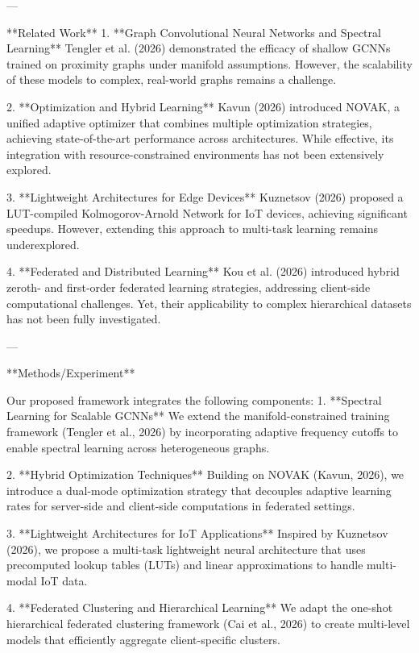 ---

**Related Work**  
1. **Graph Convolutional Neural Networks and Spectral Learning**  
Tengler et al. (2026) demonstrated the efficacy of shallow GCNNs trained on proximity graphs under manifold assumptions. However, the scalability of these models to complex, real-world graphs remains a challenge.

2. **Optimization and Hybrid Learning**  
Kavun (2026) introduced NOVAK, a unified adaptive optimizer that combines multiple optimization strategies, achieving state-of-the-art performance across architectures. While effective, its integration with resource-constrained environments has not been extensively explored.

3. **Lightweight Architectures for Edge Devices**  
Kuznetsov (2026) proposed a LUT-compiled Kolmogorov-Arnold Network for IoT devices, achieving significant speedups. However, extending this approach to multi-task learning remains underexplored.

4. **Federated and Distributed Learning**  
Kou et al. (2026) introduced hybrid zeroth- and first-order federated learning strategies, addressing client-side computational challenges. Yet, their applicability to complex hierarchical datasets has not been fully investigated.

---

**Methods/Experiment**  

Our proposed framework integrates the following components:
1. **Spectral Learning for Scalable GCNNs**  
We extend the manifold-constrained training framework (Tengler et al., 2026) by incorporating adaptive frequency cutoffs to enable spectral learning across heterogeneous graphs.

2. **Hybrid Optimization Techniques**  
Building on NOVAK (Kavun, 2026), we introduce a dual-mode optimization strategy that decouples adaptive learning rates for server-side and client-side computations in federated settings.

3. **Lightweight Architectures for IoT Applications**  
Inspired by Kuznetsov (2026), we propose a multi-task lightweight neural architecture that uses precomputed lookup tables (LUTs) and linear approximations to handle multi-modal IoT data.

4. **Federated Clustering and Hierarchical Learning**  
We adapt the one-shot hierarchical federated clustering framework (Cai et al., 2026) to create multi-level models that efficiently aggregate client-specific clusters.

